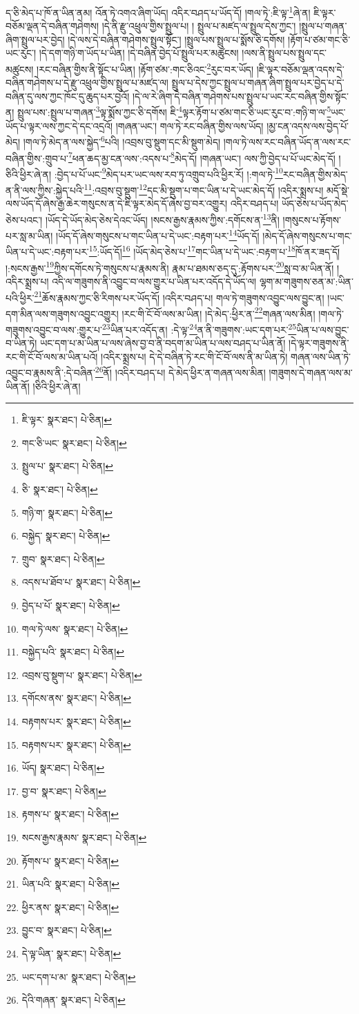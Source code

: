 ད་ཅི་མེད་པ་ཁོ་ན་ཡིན་ནམ། འོན་ཏེ་འགའ་ཞིག་ཡོད། འདིར་བཤད་པ་ཡོད་དོ། །གལ་ཏེ་:ཇི་ལྟ་\footnote{ཇི་ལྟར་  སྣར་ཐང་།  པེ་ཅིན། }ཞེ་ན། ཇི་ལྟར་བཅོམ་ལྡན་དེ་བཞིན་གཤེགས། །དེ་ནི་རྫུ་འཕྲུལ་གྱིས་སྤྲུལ་པ། །
སྤྲུལ་པ་མཛད་ལ་སྤྲུལ་དེས་ཀྱང་། །སྤྲུལ་པ་གཞན་ཞིག་སྤྲུལ་པར་བྱེད། །དེ་ལས་དེ་བཞིན་གཤེགས་སྤྲུལ་སྟོང་། །སྤྲུལ་པས་སྤྲུལ་པ་སྨོས་ཅི་དགོས། །རྟོག་པ་ཙམ་གང་ཅི་ཡང་རུང་། །དེ་དག་གཉི་ག་ཡོད་པ་ཡིན། །དེ་བཞིན་བྱེད་པོ་སྤྲུལ་པར་མཚུངས། །ལས་ནི་སྤྲུལ་པས་སྤྲུལ་དང་མཚུངས། །རང་བཞིན་གྱིས་ནི་སྟོང་པ་ཡིན། །རྟོག་ཙམ་:གང་ཅིའང་\footnote{གང་ཅི་ཡང་  སྣར་ཐང་།  པེ་ཅིན། }རུང་བར་ཡོད། །ཇི་ལྟར་བཅོམ་ལྡན་འདས་དེ་བཞིན་གཤེགས་པ་དེ་རྫུ་འཕྲུལ་གྱིས་སྤྲུལ་པ་མཛད་ལ། སྤྲུལ་པ་དེས་ཀྱང་སྤྲུལ་པ་གཞན་ཞིག་སྤྲུལ་པར་བྱེད་པ་དེ་བཞིན་དུ་ལས་ཀྱང་ཁོང་དུ་ཆུད་པར་བྱའོ། །དེ་ལ་རེ་ཞིག་དེ་བཞིན་གཤེགས་པས་སྤྲུལ་པ་ཡང་རང་བཞིན་གྱིས་སྟོང་ན། སྤྲུལ་པས་:སྤྲུལ་པ་གཞན་\footnote{སྤྲུལ་པ་  སྣར་ཐང་།  པེ་ཅིན། }ལྟ་སྨོས་ཀྱང་ཅི་དགོས། ཇི་\footnote{ཅི་  སྣར་ཐང་།  པེ་ཅིན། }ལྟར་རྟོག་པ་ཙམ་གང་ཅི་ཡང་རུང་བ་:གཉི་ག་ལ་\footnote{གཉི་ག་  སྣར་ཐང་།  པེ་ཅིན། }ཡང་ཡོད་པ་ལྟར་ལས་ཀྱང་དེ་དང་འདྲའོ། །གཞན་ཡང་། གལ་ཏེ་རང་བཞིན་གྱིས་ལས་ཡོད། །མྱ་ངན་འདས་ལས་བྱེད་པོ་མེད། །གལ་ཏེ་མེད་ན་ལས་སྐྱེད་\footnote{བསྐྱེད་  སྣར་ཐང་།  པེ་ཅིན། }པའི། །འབྲས་བུ་སྡུག་དང་མི་སྡུག་མེད། །གལ་ཏེ་ལས་རང་བཞིན་ཡོད་ན་ལས་རང་བཞིན་གྱིས་:གྲུབ་པ་\footnote{གྲུབ་  སྣར་ཐང་།  པེ་ཅིན། }ཕན་ཆད་མྱ་ངན་ལས་:འདས་པ་\footnote{འདས་པ་ཐོབ་པ་  སྣར་ཐང་།  པེ་ཅིན། }མེད་དོ། །གཞན་ཡང་། ལས་ཀྱི་བྱེད་པ་པོ་ཡང་མེད་དོ། །ཅིའི་ཕྱིར་ཞེ་ན། :བྱེད་པ་པོ་ཡང་\footnote{བྱེད་པ་པོ་  སྣར་ཐང་།  པེ་ཅིན། }མེད་པར་ཡང་ལས་རབ་ཏུ་འགྲུབ་པའི་ཕྱིར་རོ། །:གལ་ཏེ་\footnote{གལ་ཏེ་ལས་  སྣར་ཐང་།  པེ་ཅིན། }རང་བཞིན་གྱིས་མེད་ན་ནི་ལས་ཀྱིས་:སྐྱེད་པའི་\footnote{བསྐྱེད་པའི་  སྣར་ཐང་།  པེ་ཅིན། }:འབྲས་བུ་སྡུག་\footnote{འབྲས་བུ་སྡུག་པ་  སྣར་ཐང་།  པེ་ཅིན། }དང་མི་སྡུག་པ་གང་ཡིན་པ་དེ་ཡང་མེད་དོ། །འདིར་སྨྲས་པ། མདོ་སྡེ་ལས་ཡོད་དོ་ཞེས་རྒྱ་ཆེར་གསུངས་ན་དེ་ཇི་ལྟར་མེད་དོ་ཞེས་བྱ་བར་འགྱུར། འདིར་བཤད་པ། ཡོད་ཅེས་པ་ཡོད་མེད་ཅེས་པའང་། །ཡོད་དེ་ཡོད་མེད་ཅེས་དེའང་ཡོད། །སངས་རྒྱས་རྣམས་ཀྱིས་:དགོངས་ན་\footnote{དགོངས་ནས་  སྣར་ཐང་།  པེ་ཅིན། }ནི། །གསུངས་པ་རྟོགས་པར་སླ་མ་ཡིན། །ཡོད་དོ་ཞེས་གསུངས་པ་གང་ཡིན་པ་དེ་ཡང་:བརྟག་པར་\footnote{བརྟགས་པར་  སྣར་ཐང་།  པེ་ཅིན། }ཡོད་དོ། །མེད་དོ་ཞེས་གསུངས་པ་གང་ཡིན་པ་དེ་ཡང་:བརྟག་པར་\footnote{བརྟགས་པར་  སྣར་ཐང་།  པེ་ཅིན། }:ཡོད་དོ།\footnote{ཡོད།  སྣར་ཐང་།  པེ་ཅིན། } །ཡོད་མེད་ཅེས་པ་\footnote{བྱ་བ་  སྣར་ཐང་།  པེ་ཅིན། }གང་ཡིན་པ་དེ་ཡང་:བརྟག་པ་\footnote{རྟགས་པ་  སྣར་ཐང་།  པེ་ཅིན། }ཁོ་ནར་ཟད་དོ། །:སངས་རྒྱས་\footnote{སངས་རྒྱས་རྣམས་  སྣར་ཐང་།  པེ་ཅིན། }ཀྱིས་དགོངས་ཏེ་གསུངས་པ་རྣམས་ནི། རྣམ་པ་ཐམས་ཅད་དུ་:རྟོགས་པར་\footnote{རྟོགས་པ་  སྣར་ཐང་།  པེ་ཅིན། }སླ་བ་མ་ཡིན་ནོ། །འདིར་སྨྲས་པ། འདི་ལ་གཟུགས་ནི་འབྱུང་བ་ལས་གྱུར་པ་ཡིན་པར་འདོད་དེ་ཡོད་ལ། ལྷག་མ་གཟུགས་ཅན་མ་:ཡིན་པའི་ཕྱིར་\footnote{ཡིན་པའི་  སྣར་ཐང་།  པེ་ཅིན། }ཆོས་རྣམས་ཀྱང་ཅི་རིགས་པར་ཡོད་དོ། །འདིར་བཤད་པ། གལ་ཏེ་གཟུགས་འབྱུང་ལས་བྱུང་ན། །ཡང་དག་མིན་ལས་གཟུགས་འབྱུང་འགྱུར། །རང་གི་ངོ་བོ་ལས་མ་ཡིན། །དེ་མེད་:ཕྱིར་ན་\footnote{ཕྱིར་ནས་  སྣར་ཐང་།  པེ་ཅིན། }གཞན་ལས་མིན། །གལ་ཏེ་གཟུགས་འབྱུང་བ་ལས་:གྱུར་པ་\footnote{བྱུང་བ་  སྣར་ཐང་།  པེ་ཅིན། }ཡིན་པར་འདོད་ན། :དེ་ལྟ་\footnote{དེ་ལྟ་ཡིན་  སྣར་ཐང་།  པེ་ཅིན། }ན་ནི་གཟུགས་:ཡང་དག་པར་\footnote{ཡང་དག་པ་མ་  སྣར་ཐང་།  པེ་ཅིན། }ཡིན་པ་ལས་བྱུང་བ་ཡིན་ཏེ། ཡང་དག་པ་མ་ཡིན་པ་ལས་ཞེས་བྱ་བ་ནི་བདག་མ་ཡིན་པ་ལས་བཤད་པ་ཡིན་ནོ། །དེ་ལྟར་གཟུགས་ནི་རང་གི་ངོ་བོ་ལས་མ་ཡིན་པའོ། །འདིར་སྨྲས་པ། དེ་དེ་བཞིན་ཏེ་རང་གི་ངོ་བོ་ལས་ནི་མ་ཡིན་ཏེ། གཞན་ལས་ཡིན་ཏེ་འབྱུང་བ་རྣམས་ནི་:དེ་བཞིན་\footnote{དེའི་གཞན་  སྣར་ཐང་།  པེ་ཅིན། }ནོ། །འདིར་བཤད་པ། དེ་མེད་ཕྱིར་ན་གཞན་ལས་མིན། །གཟུགས་དེ་གཞན་ལས་མ་ཡིན་ནོ། །ཅིའི་ཕྱིར་ཞེ་ན། 